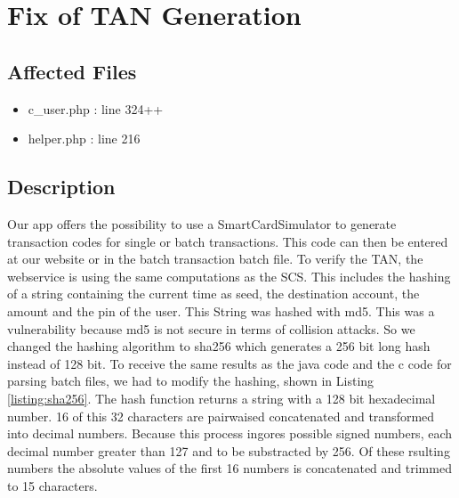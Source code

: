 \chapter{Fix of TAN Generation}
\section{Affected Files}
\begin{itemize}
	\item c\_user.php : line 324++
	\item helper.php : line 216
\end{itemize}

\section{Description}

Our app offers the possibility to use a SmartCardSimulator to generate transaction codes for single or batch transactions. This code can then be entered at our website or in the batch transaction batch file.
To verify the TAN, the webservice is using the same computations as the SCS. This includes the hashing of a string containing the current time as seed, the destination account, the amount and the pin of the user. This String was hashed with md5. This was a vulnerability because md5 is not secure in terms of collision attacks. So we changed the hashing algorithm to sha256 which generates a 256 bit long hash instead of 128 bit. To receive the same results as the java code and the c code for parsing batch files, we had to modify the hashing, shown in Listing \ref{listing:sha256}. The hash function returns a string with a 128 bit  hexadecimal number. 16 of this 32 characters are pairwaised concatenated and transformed into decimal numbers. Because this process ingores possible signed numbers, each decimal number greater than 127 and to be substracted by 256. Of these rsulting numbers the absolute values of the first 16 numbers is concatenated and trimmed to 15 characters.   \newline
\newline

